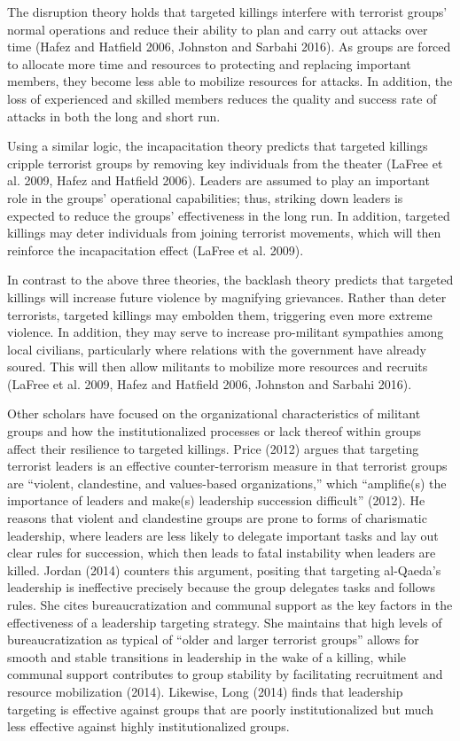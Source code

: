 \documentclass[letterpaper,12pt]{article}
\theoremstyle{definition}
\begin{document}
The disruption theory holds that targeted killings interfere with terrorist groups' normal operations and reduce their ability to plan and carry out attacks over time (Hafez and Hatfield 2006, Johnston and Sarbahi 2016). As groups are forced to allocate more time and resources to protecting and replacing important members, they become less able to mobilize resources for attacks. In addition, the loss of experienced and skilled members reduces the quality and success rate of attacks in both the long and short run.

Using a similar logic, the incapacitation theory predicts that targeted killings cripple terrorist groups by removing key individuals from the theater (LaFree et al. 2009, Hafez and Hatfield 2006). Leaders are assumed to play an important role in the groups' operational capabilities; thus, striking down leaders is expected to reduce the groups' effectiveness in the long run. In addition, targeted killings may deter individuals from joining terrorist movements, which will then reinforce the incapacitation effect (LaFree et al. 2009).

In contrast to the above three theories, the backlash theory predicts that targeted killings will increase future violence by magnifying grievances. Rather than deter terrorists, targeted killings may embolden them, triggering even more extreme violence. In addition, they may serve to increase pro-militant sympathies among local civilians, particularly where relations with the government have already soured. This will then allow militants to mobilize more resources and recruits (LaFree et al. 2009, Hafez and Hatfield 2006, Johnston and Sarbahi 2016).

Other scholars have focused on the organizational characteristics of militant groups and how the institutionalized processes or lack thereof within groups affect their resilience to targeted killings.	Price (2012) argues that targeting terrorist leaders is an effective counter-terrorism measure in that terrorist groups are ``violent, clandestine, and values-based organizations,'' which ``amplifie(s) the importance of leaders and make(s) leadership succession difficult'' (2012). He reasons that violent and clandestine groups are prone to forms of charismatic leadership, where leaders are less likely to delegate important tasks and lay out clear rules for succession, which then leads to fatal instability when leaders are killed. Jordan (2014) counters this argument, positing that targeting al-Qaeda's leadership is ineffective precisely because the group delegates tasks and follows rules. She cites bureaucratization and communal support as the key factors in the effectiveness of a leadership targeting strategy. She maintains that high levels of bureaucratization as typical of ``older and larger terrorist groups'' allows for smooth and stable transitions in leadership in the wake of a killing, while communal support contributes to group stability by facilitating recruitment and resource mobilization (2014). Likewise, Long (2014) finds that leadership targeting is effective against groups that are poorly institutionalized but much less effective against highly institutionalized groups.
\end{document}
